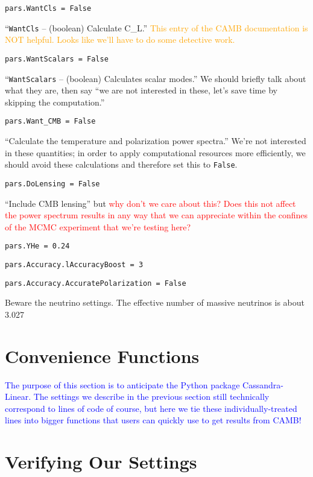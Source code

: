 \verb|pars.WantCls = False|

``\verb|WantCls| – (boolean) Calculate C\_L.'' \textcolor{orange}{This entry 
of
the CAMB documentation is NOT helpful. Looks like we’ll have to do some
detective work.}

\verb|pars.WantScalars = False|

``\verb|WantScalars| – (boolean) Calculates scalar modes.'' We should briefly 
talk about what they are, then say ``we are not interested in these, let's 
save time by skipping the computation.''

\verb|pars.Want_CMB = False|

``Calculate the temperature and polarization power spectra.'' We're not 
interested in these quantities; in order to apply computational resources more 
efficiently, we should avoid these calculations and therefore set this to 
\verb|False|.

\verb|pars.DoLensing = False|

``Include CMB lensing'' but \textcolor{red}{why don't we care about this? Does
this not affect the power spectrum results in any way that we can appreciate
within the confines of the MCMC experiment that we're testing here?}

\verb|pars.YHe = 0.24|

\verb|pars.Accuracy.lAccuracyBoost = 3|

\verb|pars.Accuracy.AccuratePolarization = False|


Beware the neutrino settings. The effective number of massive neutrinos is about 3.027

\section{Convenience Functions}


\textcolor{blue}{The purpose of this section is to anticipate the Python
package Cassandra-Linear. The settings we describe in the previous section
still technically correspond to lines of code of course, but here we tie these
individually-treated lines into bigger functions that users can quickly use to
get results from CAMB!}

\section{Verifying Our Settings}

